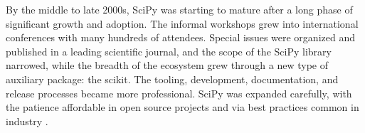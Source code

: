 \documentclass[fleqn,10pt]{wlscirep}
\begin{document}
%
%
%
%
%
%
%
%
%
%
%
%
%
%
%
%
%
%
%
%
%
%
%
%
%
%


By the middle to late 2000s, SciPy was starting to mature after a long phase of significant
growth and adoption.
The informal workshops grew into international conferences with many
hundreds of attendees. Special issues were organized and published in a
leading scientific journal\cite{dubois2007guest}, and the scope of the SciPy library
narrowed, while the breadth of the ecosystem grew
through a new type of auxiliary package: the scikit\cite{scikits-general}.
The tooling, development, documentation, and release processes became more professional.
SciPy was expanded carefully, with the patience affordable in open source 
projects and via best practices common in industry \cite{millman2014developing}.
\end{document}
